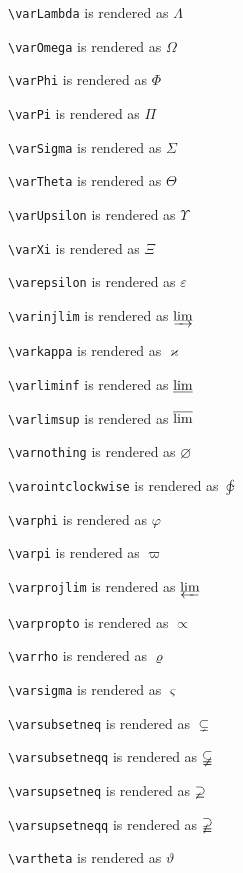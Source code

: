 \texttt{\textbackslash varLambda} is rendered as $\varLambda$

\texttt{\textbackslash varOmega} is rendered as $\varOmega$

\texttt{\textbackslash varPhi} is rendered as $\varPhi$

\texttt{\textbackslash varPi} is rendered as $\varPi$

\texttt{\textbackslash varSigma} is rendered as $\varSigma$

\texttt{\textbackslash varTheta} is rendered as $\varTheta$

\texttt{\textbackslash varUpsilon} is rendered as $\varUpsilon$

\texttt{\textbackslash varXi} is rendered as $\varXi$

\texttt{\textbackslash varepsilon} is rendered as $\varepsilon$

\texttt{\textbackslash varinjlim} is rendered as $\varinjlim$

\texttt{\textbackslash varkappa} is rendered as $\varkappa$

\texttt{\textbackslash varliminf} is rendered as $\varliminf$

\texttt{\textbackslash varlimsup} is rendered as $\varlimsup$

\texttt{\textbackslash varnothing} is rendered as $\varnothing$

\texttt{\textbackslash varointclockwise} is rendered as $\varointclockwise$

\texttt{\textbackslash varphi} is rendered as $\varphi$

\texttt{\textbackslash varpi} is rendered as $\varpi$

\texttt{\textbackslash varprojlim} is rendered as $\varprojlim$

\texttt{\textbackslash varpropto} is rendered as $\varpropto$

\texttt{\textbackslash varrho} is rendered as $\varrho$

\texttt{\textbackslash varsigma} is rendered as $\varsigma$

\texttt{\textbackslash varsubsetneq} is rendered as $\varsubsetneq$

\texttt{\textbackslash varsubsetneqq} is rendered as $\varsubsetneqq$

\texttt{\textbackslash varsupsetneq} is rendered as $\varsupsetneq$

\texttt{\textbackslash varsupsetneqq} is rendered as $\varsupsetneqq$

\texttt{\textbackslash vartheta} is rendered as $\vartheta$

